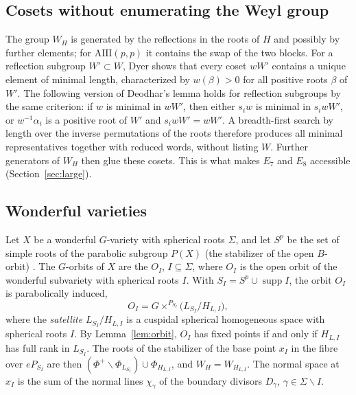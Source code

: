 \documentclass[11pt]{amsart}
\theoremstyle{definition}
\theoremstyle{remark}
\DeclareMathOperator{\supp}{supp}
\begin{document}
\subsection{Cosets without enumerating the Weyl group}
The group $W_H$ is generated by the reflections in the roots of $H$ and
possibly by further elements; for $\mathrm{AIII}(p,p)$ it contains the
swap of the two blocks. For a reflection subgroup $W'\subset W$, Dyer
\cite{Dyer} shows that every coset $wW'$ contains a unique element of
minimal length, characterized by $w(\beta)>0$ for all positive roots
$\beta$ of $W'$. The following version of Deodhar's lemma \cite{Deodhar}
holds for reflection subgroups by the same criterion: if $w$ is minimal in
$wW'$, then either $s_iw$ is minimal in $s_iwW'$, or $w^{-1}\alpha_i$ is a
positive root of $W'$ and $s_iwW' = wW'$. A breadth-first search by length
over the inverse permutations of the roots therefore produces all minimal
representatives together with reduced words, without listing $W$. Further
generators of $W_H$ then glue these cosets. This is what makes $E_7$ and
$E_8$ accessible (Section~\ref{sec:large}).

\subsection{Wonderful varieties}\label{subsec:wonderful}
Let $X$ be a wonderful $G$-variety with spherical roots $\Sigma$, and let
$S^p$ be the set of simple roots of the parabolic subgroup $P(X)$ (the
stabilizer of the open $B$-orbit) \cite{Luna01,Timashev,Perrin}. The $G$-orbits of $X$
are the $O_I$, $I\subseteq\Sigma$, where $O_I$ is the open orbit of the
wonderful subvariety with spherical roots $I$. With
$S_I = S^p\cup\supp I$, the orbit $O_I$ is parabolically induced,
\[
O_I = G\times^{P_{S_I}} \bigl(L_{S_I}/H_{L,I}\bigr),
\]
where the \emph{satellite} $L_{S_I}/H_{L,I}$ is a cuspidal spherical
homogeneous space with spherical roots $I$. By Lemma~\ref{lem:orbit}, $O_I$
has fixed points if and only if $H_{L,I}$ has full rank in $L_{S_I}$. The
roots of the stabilizer of the base point $x_I$ in the fibre over
$eP_{S_I}$ are then $(\Phi^+\smallsetminus\Phi_{L_{S_I}})\cup\Phi_{H_{L,I}}$,
and $W_{H} = W_{H_{L,I}}$. The normal space at $x_I$ is the sum of the normal
lines $\chi_\gamma$ of the boundary divisors $D_\gamma$,
$\gamma\in\Sigma\smallsetminus I$.
\end{document}

